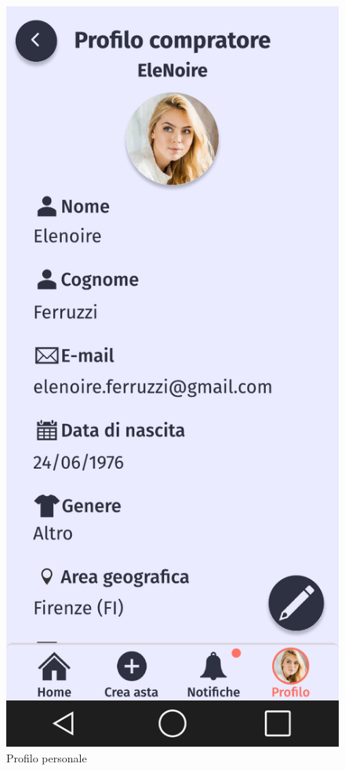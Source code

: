 \begin{figure}[!htb]
\begin{minipage}{0.32\textwidth}
                    \centering
                    \includegraphics[width=.7\linewidth]{Immagini/Frames/Compratore/C11.pdf}
                    \caption{Profilo personale}
            \end{minipage}\hfill
        \end{figure}

